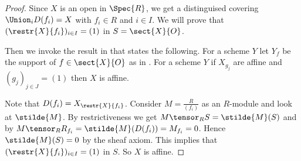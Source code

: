 \begin{proof}
Since $X$ is an open in $\Spec{R}$, 
we get a distinguised covering $\Union_i D(f_i) = X$ with $f_i\in R$
and $i\in I$.
We will prove that $(\restr{X}{f_i})_{i\in I} = (1)$ in $S = \sect{X}{O}$.

Then we invoke the result in \cite[Ex. 2.1.7]{harts} that states the following.
For a scheme $Y$ let $Y_f$  be the support of $f\in \sect{X}{O}$ as in .
For a scheme $Y$ if $X_{g_j}$ are affine and $(g_j)_{j\in J}=(1)$
then $X$ is affine.

Note that $D(f_i) = X_{\restr{X}{f_i}}$.
Consider $M = \frac{R}{(f_i)}$ as an $R$-module and look at $\stilde{M}$.
By restrictiveness we get $M \tensor_R S = \stilde{M}(S)$ and  
by $M \tensor_R R_{f_i} = \stilde{M}(D(f_i)) = M_{f_i} = 0$. 
Hence $\stilde{M}(S) = 0$ by the sheaf axiom.
This implies that $(\restr{X}{f_i})_{i\in I} = (1)$ in $S$.
So $X$ is affine.
\end{proof}
